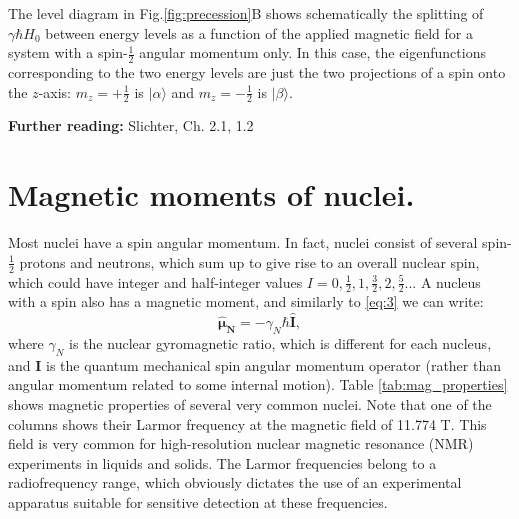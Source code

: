 \documentclass[a4paper, 12pt]{article}
\begin{document}
The level diagram in Fig.\ref{fig:precession}B shows schematically the splitting of $\gamma \hbar H_0 $ between energy levels  as a function of the applied magnetic field for a system with  a spin-$\frac{1}{2}$ angular momentum only. In this case, the eigenfunctions corresponding to the two energy levels are just the two projections of a spin onto the $z$-axis: $m_z=+\frac{1}{2}$ is $\vert \alpha \rangle$ and $m_z=-\frac{1}{2}$ is $\vert \beta \rangle$.

\textbf{Further reading:} Slichter, Ch. 2.1, 1.2 

\section{Magnetic moments of nuclei.}
Most nuclei have a spin angular momentum. In fact, nuclei consist of several spin-$\frac{1}{2}$ protons and neutrons, which sum up to give rise to an overall nuclear spin, which could have integer and half-integer values $I=0, \frac{1}{2}, 1, \frac{3}{2}, 2, \frac{5}{2}...$ A nucleus with a spin also has a magnetic moment, and similarly to \ref{eq:3} we can write:
\begin{equation}
\bm{\hat{\mu}_N} = -\gamma_N \hbar \bm{\hat{I}},
\end{equation}
where $\gamma_N$ is the nuclear gyromagnetic ratio, which is different for each nucleus, and $\bm{I}$ is the quantum mechanical spin angular momentum operator (rather than angular momentum related to some internal motion). Table \ref{tab:mag_properties} shows magnetic properties of several very common nuclei. Note that one of the columns shows their Larmor frequency at the magnetic field of 11.774 T. This field is very common for high-resolution nuclear magnetic resonance (NMR) experiments in liquids and solids. The Larmor frequencies belong to a radiofrequency range, which obviously dictates the use of an experimental apparatus suitable for sensitive detection at these frequencies. 
\end{document}
